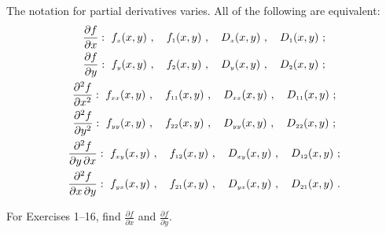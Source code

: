 The notation for partial derivatives varies. All of the following are equivalent:
\begin{gather*}
 \dfrac{\partial f}{\partial x}:~ f_{\scriptscriptstyle x}(x,y) ~, \quad f_{\scriptscriptstyle 1}(x,y) ~, \quad D_{\scriptscriptstyle x}(x,y) ~, \quad
  D_{\scriptscriptstyle 1}(x,y)~;
  \\
 \dfrac{\partial f}{\partial y}:~ f_{\scriptscriptstyle y}(x,y) ~, \quad f_{\scriptscriptstyle 2}(x,y) ~, \quad D_{\scriptscriptstyle y}(x,y) ~, \quad
  D_{\scriptscriptstyle 2}(x,y)~;
  \\
 \dfrac{\partial^2 f}{\partial x^2}:~ f_{\scriptscriptstyle xx}(x,y) ~, \quad f_{\scriptscriptstyle 11}(x,y) ~, \quad D_{\scriptscriptstyle xx}(x,y) ~, \quad
  D_{\scriptscriptstyle 11}(x,y)~;
  \\
 \dfrac{\partial^2 f}{\partial y^2}:~ f_{\scriptscriptstyle yy}(x,y) ~, \quad f_{\scriptscriptstyle 22}(x,y) ~, \quad D_{\scriptscriptstyle yy}(x,y) ~, \quad
  D_{\scriptscriptstyle 22}(x,y)~;
  \\
 \dfrac{\partial^2 f}{\partial y \, \partial x}: ~ f_{\scriptscriptstyle xy}(x,y) ~, \quad f_{\scriptscriptstyle 12}(x,y) ~, \quad
  D_{\scriptscriptstyle xy}(x,y) ~, \quad
  D_{\scriptscriptstyle 12}(x,y)~;
  \\
 \dfrac{\partial^2 f}{\partial x \, \partial y}: ~ f_{\scriptscriptstyle yx}(x,y) ~, \quad f_{\scriptscriptstyle 21}(x,y) ~, \quad
  D_{\scriptscriptstyle yx}(x,y) ~, \quad
  D_{\scriptscriptstyle 21}(x,y)~.
\end{gather*}
\centerline{}\label{sec2dot2}
\par\noindent For Exercises 1--16, find $\frac{\partial f}{\partial x}$ and $\frac{\partial f}{\partial y}$.
